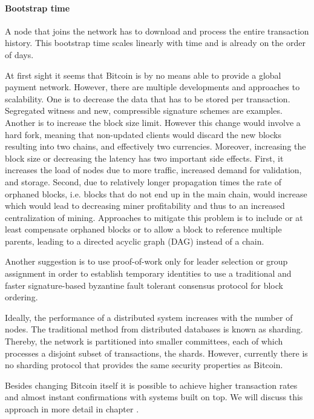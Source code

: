 \paragraph{Bootstrap time} A node that joins the network has to download and process the entire transaction history. This bootstrap time scales linearly with time and is already on the order of days.

At first sight it seems that Bitcoin is by no means able to provide a global payment network. However, there are multiple developments and approaches to scalability. One is to decrease the data that has to be stored per transaction. Segregated witness \parencite{bip141} and new, compressible signature schemes are examples. Another is to increase the block size limit. However this change would involve a hard fork, meaning that non-updated clients would discard the new blocks resulting into two chains, and effectively two currencies. Moreover, increasing the block size or decreasing the latency has two important side effects. First, it increases the load of nodes due to more traffic, increased demand for validation, and storage. Second, due to relatively longer propagation times the rate of orphaned blocks, i.e. blocks that do not end up in the main chain, would increase which would lead to decreasing miner profitability and thus to an increased centralization of mining. Approaches to mitigate this problem is to include or at least compensate orphaned blocks \parencite{kiayias2016trees,Lewenberg2015,Sompolinsky2015} or to allow a block to reference multiple parents, leading to a directed acyclic graph (DAG) instead of a chain.

Another suggestion is to use proof-of-work only for leader selection \parencite{194906} or group assignment \parencite{DBLP:journals/corr/Kokoris-KogiasJ16} in order to establish temporary identities to use a traditional and faster signature-based byzantine fault tolerant consensus protocol for block ordering. 

Ideally, the performance of a distributed system increases with the number of nodes. The traditional method from distributed databases is known as sharding. Thereby, the network is partitioned into smaller committees, each of which processes a disjoint subset of transactions, the shards. However, currently there is no sharding protocol that provides the same security properties as Bitcoin.
 
Besides changing Bitcoin itself it is possible to achieve higher transaction rates and almost instant confirmations with systems built on top. We will discuss this approach in more detail in chapter \parencite{sec:m2m}.
 
